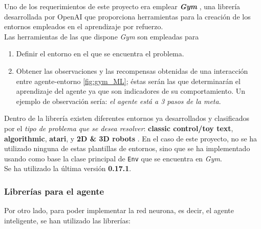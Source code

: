 Uno de los requerimientos  de este proyecto era emplear \textit{\textbf{Gym}} \cite{gymDocumentation}, una librería desarrollada por OpenAI que proporciona herramientas para la creación de los entornos empleados en el aprendizaje por refuerzo. \\

Las herramientas de las que dispone \textit{Gym} son empleadas para

\begin{enumerate}
    \item Definir el entorno en el que se encuentra el problema.
    \item Obtener las observaciones y las recompensas obtenidas de una interacción entre agente-entorno \ref{fig:gym_ML}; éstas serán las que determinarán el aprendizaje del agente ya que son indicadores de su comportamiento. Un ejemplo de observación sería: \textit{el agente está a 3 pasos de la meta}. 
\end{enumerate}

Dentro de la librería existen diferentes entornos ya desarrollados y clasificados por el \textit{tipo de problema que se desea resolver}:  \textbf{classic control/toy text}, \textbf{algorithmic}, \textbf{atari}, y  \textbf{2D \& 3D robots} \cite{gymDocumentation}. En el caso de este proyecto, no se ha utilizado ninguna de estas plantillas de entornos, sino que se ha implementado usando como base la clase principal de \texttt{Env} que se encuentra en \textit{Gym}.  \\

Se ha utilizado la última versión \textbf{0.17.1}.

\subsubsection{Librerías para el agente}

Por otro lado, para poder implementar la red neurona, es decir, el agente inteligente, se han utilizado las librerías:

